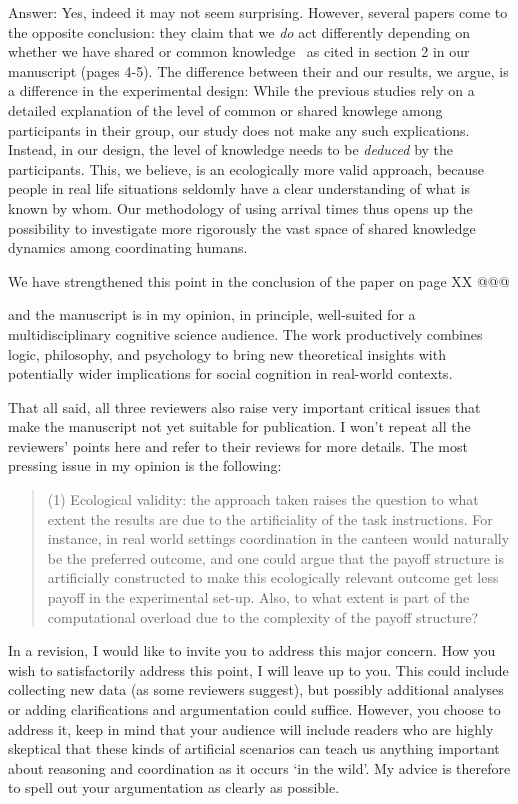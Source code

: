 \documentclass{article}
\newenvironment{robin}{\smallskip \noindent \color{red!10!green!50!blue}}{\color{black}\smallskip}
\begin{document}
\begin{robin}
Answer: Yes, indeed it may not seem surprising. However, several papers come to the opposite conclusion: they claim that we \emph{do} act differently depending on whether we have shared or common knowledge~\cite{rubinstein1989electronic, lee2010rationales, thomas2014psychology, thomas2016recursive, thomas2018common, de2019common, de2019maimonides} as cited in section 2 in our manuscript (pages 4-5). The difference between their and our results, we argue, is a difference in the experimental design: While the previous studies rely on a detailed explanation of the level of common or shared knowlege among participants in their group, our study does not make any such explications. Instead, in our design, the level of knowledge needs to be \emph{deduced} by the participants. This, we believe, is an ecologically more valid approach, because people in real life situations seldomly have a clear understanding of what is known by whom. Our methodology of using arrival times thus opens up the possibility to investigate more rigorously the vast space of shared knowledge dynamics among coordinating humans. 

We have strengthened this point in the conclusion of the paper on page XX @@@
\end{robin} 
 
  and the manuscript is in my opinion, in principle, well-suited for a multidisciplinary cognitive science audience. The work productively combines logic, philosophy, and psychology to bring new theoretical insights with potentially wider implications for social cognition in real-world contexts.

That all said, all three reviewers also raise very important critical issues that make the manuscript not yet suitable for publication. I won’t repeat all the reviewers' points here and refer to their reviews for more details. The most pressing issue in my opinion is the following:
\begin{quote}
(1)    Ecological validity: the approach taken raises the question to what extent the results are due to the artificiality of the task instructions. For instance, in real world settings coordination in the canteen would naturally be the preferred outcome, and one could argue that the payoff structure is artificially constructed to make this ecologically relevant outcome get less payoff in the experimental set-up. Also, to what extent is part of the computational overload due to the complexity of the payoff structure? 
\end{quote}
In a revision, I would like to invite you to address this major concern. How you wish to satisfactorily address this point, I will leave up to you. This could include collecting new data (as some reviewers suggest), but possibly additional analyses or adding clarifications and argumentation could suffice. However, you choose to address it, keep in mind that your audience will include readers who are highly skeptical that these kinds of artificial scenarios can teach us anything important about reasoning and coordination as it occurs ‘in the wild’. My advice is therefore to spell out your argumentation as clearly as possible.  
\end{document}
